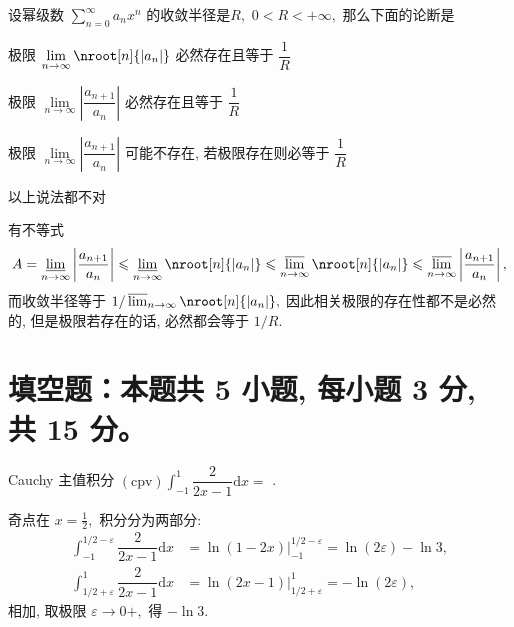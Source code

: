 \begin{question}
设幂级数 $\sum\limits_{n=0}^\infty a_n x^n$ 的收敛半径是$R,$ $0 < R < +\infty,$ 那么下面的论断是 \paren[C]

\begin{choices}
\item 极限 $\lim\limits_{n\to\infty} \nroot[n]{\lvert a_n \rvert}$ 必然存在且等于 $\dfrac{1}{R}$
\item 极限 $\lim\limits_{n\to\infty} \left\lvert \dfrac{a_{n+1}}{a_n} \right\rvert$ 必然存在且等于 $\dfrac{1}{R}$
\item 极限 $\lim\limits_{n\to\infty} \left\lvert \dfrac{a_{n+1}}{a_n} \right\rvert$ 可能不存在, 若极限存在则必等于 $\dfrac{1}{R}$
\item 以上说法都不对
\end{choices}
\end{question}

\begin{solution}
有不等式
\[A = \varliminf_{n\to\infty} \left\lvert \dfrac{a_{n+1}}{a_n} \right\rvert \leqslant \varliminf_{n\to\infty} \nroot[n]{\lvert a_n \rvert} \leqslant \varlimsup_{n\to\infty} \nroot[n]{\lvert a_n \rvert} \leqslant \varlimsup_{n\to\infty}  \left\lvert \dfrac{a_{n+1}}{a_n} \right\rvert,\]
而收敛半径等于 $1 / \varlimsup_{n\to\infty} \nroot[n]{\lvert a_n \rvert},$ 因此相关极限的存在性都不是必然的, 但是极限若存在的话, 必然都会等于 $1 / R.$
\end{solution}


\section{填空题：本题共 5 小题, 每小题 3 分, 共 15 分。}



\begin{question}
Cauchy 主值积分 $\displaystyle (\text{cpv}) \int_{-1}^1 \dfrac{2}{2x-1} \mathrm{d}x =$ \fillin[$-\ln 3$].
\end{question}

\begin{solution}
奇点在 $x = \frac{1}{2},$ 积分分为两部分:
\begin{align*}
\int_{-1}^{1/2 - \varepsilon} \dfrac{2}{2x-1} \mathrm{d}x & = \ln (1 - 2x) \bigg|_{-1}^{1/2 - \varepsilon} = \ln(2\varepsilon) - \ln 3, \\
\int_{1/2 + \varepsilon}^1 \dfrac{2}{2x-1} \mathrm{d}x & = \ln (2x - 1) \bigg|_{1/2 + \varepsilon}^1 = -\ln(2\varepsilon),
\end{align*}
相加, 取极限 $\varepsilon \to 0+,$ 得 $-\ln 3.$
\end{solution}

